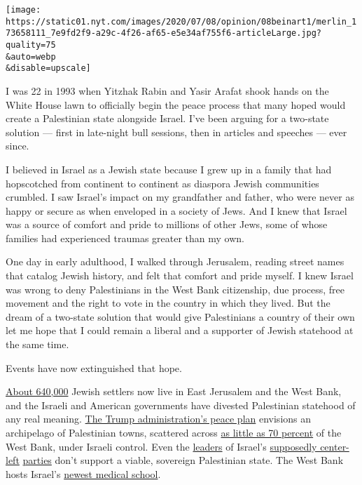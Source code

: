 \texttt{[image: https://static01.nyt.com/images/2020/07/08/opinion/08beinart1/merlin\_173658111\_7e9fd2f9-a29c-4f26-af65-e5e34af755f6-articleLarge.jpg?quality=75\\\&auto=webp\\\&disable=upscale]}

I was 22 in 1993 when Yitzhak Rabin and Yasir Arafat shook hands on the
White House lawn to officially begin the peace process that many hoped
would create a Palestinian state alongside Israel. I've been arguing for
a two-state solution --- first in late-night bull sessions, then in
articles and speeches --- ever since.

I believed in Israel as a Jewish state because I grew up in a family
that had hopscotched from continent to continent as diaspora Jewish
communities crumbled. I saw Israel's impact on my grandfather and
father, who were never as happy or secure as when enveloped in a society
of Jews. And I knew that Israel was a source of comfort and pride to
millions of other Jews, some of whose families had experienced traumas
greater than my own.

One day in early adulthood, I walked through Jerusalem, reading street
names that catalog Jewish history, and felt that comfort and pride
myself. I knew Israel was wrong to deny Palestinians in the West Bank
citizenship, due process, free movement and the right to vote in the
country in which they lived. But the dream of a two-state solution that
would give Palestinians a country of their own let me hope that I could
remain a liberal and a supporter of Jewish statehood at the same time.

Events have now extinguished that hope.

\href{https://fmep.org/resource/settlement-report-october-11-2019/}{About
640,000} Jewish settlers now live in East Jerusalem and the West Bank,
and the Israeli and American governments have divested Palestinian
statehood of any real meaning.
\href{https://www.nytimes.com/2020/01/28/world/middleeast/peace-plan.html}{The
Trump administration's peace plan} envisions an archipelago of
Palestinian towns, scattered across
\href{https://www.nytimes.com/2020/01/28/world/middleeast/israel-west-bank-annex-sovereignty.html}{as
little as 70 percent} of the West Bank, under Israeli control. Even the
\href{https://www.nytimes.com/2019/02/27/opinion/israel-election-two-state-solution.html}{leaders}
of Israel's
\href{https://www.timesofisrael.com/joining-forces-with-gantz-yaalon-rules-out-support-for-two-state-solution/}{supposedly
center-left}
\href{https://www.haaretz.com/israel-news/elections/yair-lapid-outlines-four-demands-for-peace-with-palestinians-1.7000533}{parties}
don't support a viable, sovereign Palestinian state. The West Bank hosts
Israel's
\href{https://www.timesofisrael.com/us-ambassador-toasts-opening-of-new-israeli-medical-school-in-west-bank/}{newest
medical school}.

